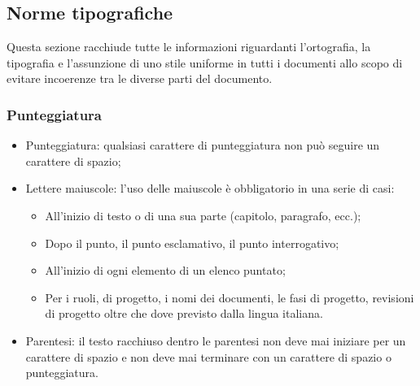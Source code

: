 \subsection{Norme tipografiche}
Questa sezione racchiude tutte le informazioni riguardanti l'ortografia, la tipografia e l'assunzione di uno stile uniforme in tutti i documenti allo scopo di evitare incoerenze tra le diverse parti del documento.

\subsubsection{Punteggiatura}
\begin{itemize}
	\item Punteggiatura: qualsiasi carattere di punteggiatura non può seguire un carattere di spazio;
	\item Lettere maiuscole: l'uso delle maiuscole è obbligatorio in una serie di casi:
	\begin{itemize}
		\item All'inizio di testo o di una sua parte (capitolo, paragrafo, ecc.);
		\item Dopo il punto, il punto esclamativo, il punto interrogativo;
		\item All'inizio di ogni elemento di un elenco puntato;
		\item Per i ruoli, di progetto, i nomi dei documenti, le fasi di progetto, revisioni di progetto oltre che dove previsto dalla lingua italiana.
	\end{itemize}
	\item Parentesi: il testo racchiuso dentro le parentesi non deve mai iniziare per un carattere di spazio e non deve mai terminare con un carattere di spazio o punteggiatura.
\end{itemize}	

